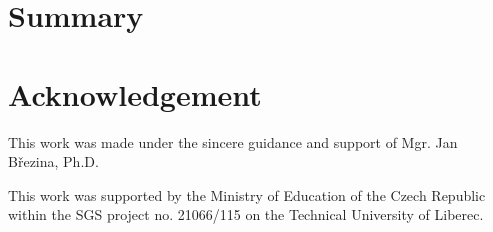 \documentclass[preprint,12pt]{elsarticle}
\begin{document}
\section{Summary}
\label{sec:summary}

\section{Acknowledgement}
This work was made under the sincere guidance and support of Mgr. Jan B{\v r}ezina, Ph.D.

This work was supported by the Ministry of Education of the Czech Republic within the SGS project 
no. 21066/115 on the Technical University of Liberec.





% 
% 
% 
  
 
\end{document}
